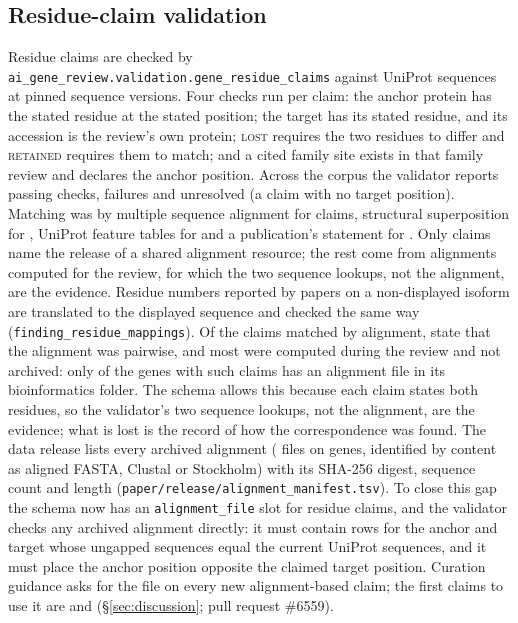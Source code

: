 \subsection{Residue-claim validation}\label{sec:methods-residue}
Residue claims are checked by \texttt{ai\_gene\_review.validation.gene\_residue\_claims} against UniProt
sequences at pinned sequence versions. Four checks run per claim: the anchor protein has the stated residue
at the stated position; the target has its stated residue, and its accession is the review's own protein;
\textsc{lost} requires the two residues to differ and \textsc{retained} requires them to match; and a cited
family site exists in that family review and declares the anchor position. Across the corpus the validator
reports \nResCheckPass{} passing checks, \nResCheckFail{} failures and \nResCheckUnresolved{} unresolved
(a claim with no target position). Matching was by multiple sequence alignment for \nResMethodMsa{} claims,
structural superposition for \nResMethodStructure{}, UniProt feature tables for \nResMethodUniprotFeature{}
and a publication's statement for \nResMethodLiterature{}. Only \nResPinned{} claims name the release of a
shared alignment resource; the rest come from alignments computed for the review, for which the two
sequence lookups, not the alignment, are the evidence. Residue numbers reported by papers on a
non-displayed isoform are translated to the displayed sequence and checked the same way
(\texttt{finding\_residue\_mappings}).
Of the \nAlnMsaClaims{} claims matched by alignment, \nAlnMsaPairwise{} state that the alignment was
pairwise, and most were computed during the review and not archived: only \nAlnMsaClaimGenesCovered{} of the
\nAlnMsaClaimGenes{} genes with such claims has an alignment file in its bioinformatics folder. The schema
allows this because each claim states both residues, so the validator's two sequence lookups, not the
alignment, are the evidence; what is lost is the record of how the correspondence was found. The data
release lists every archived alignment (\nAlnFiles{} files on \nAlnGenes{} genes, identified by content as
aligned FASTA, Clustal or Stockholm) with its SHA-256 digest, sequence count and length
(\texttt{paper/release/alignment\_manifest.tsv}). To close this gap the schema now has an
\texttt{alignment\_file} slot for residue claims, and the validator checks any archived alignment directly:
it must contain rows for the anchor and target whose ungapped sequences equal the current UniProt sequences,
and it must place the anchor position opposite the claimed target position. Curation guidance asks for the
file on every new alignment-based claim; the first claims to use it are  and 
(\S\ref{sec:discussion}; pull request \#6559).

